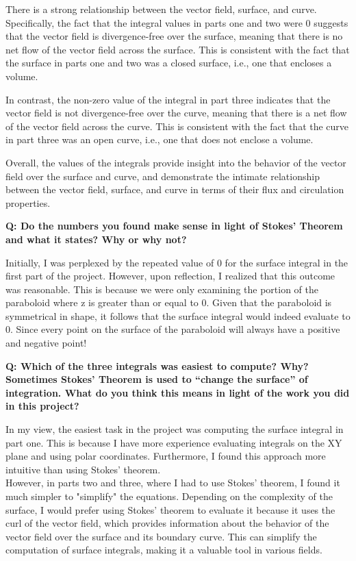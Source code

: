 \documentclass[a4paper]{article}
\begin{document}
There is a strong relationship between the vector field, surface, and curve. Specifically, the fact that the integral values in parts one and two were 0 suggests that the vector field is divergence-free over the surface, meaning that there is no net flow of the vector field across the surface. This is consistent with the fact that the surface in parts one and two was a closed surface, i.e., one that encloses a volume.

In contrast, the non-zero value of the integral in part three indicates that the vector field is not divergence-free over the curve, meaning that there is a net flow of the vector field across the curve. This is consistent with the fact that the curve in part three was an open curve, i.e., one that does not enclose a volume.

Overall, the values of the integrals provide insight into the behavior of the vector field over the surface and curve, and demonstrate the intimate relationship between the vector field, surface, and curve in terms of their flux and circulation properties.
 
\textbf{Q: Do the numbers you found make sense in light of Stokes’ Theorem and what it states?  Why or why not?}

Initially, I was perplexed by the repeated value of 0 for the surface integral in the first part of the project. However, upon reflection, I realized that this outcome was reasonable. This is because we were only examining the portion of the paraboloid where z is greater than or equal to 0. Given that the paraboloid is symmetrical in shape, it follows that the surface integral would indeed evaluate to 0. Since every point on the surface of the paraboloid will always have a positive and negative point!


\textbf{Q: Which of the three integrals was easiest to compute?  Why?  
Sometimes Stokes’ Theorem is used to “change the surface” of integration.  What do you think this means in light of the work you did in this project?}

In my view, the easiest task in the project was computing the surface integral in part one. This is because I have more experience evaluating integrals on the XY plane and using polar coordinates. Furthermore, I found this approach more intuitive than using Stokes' theorem.
\\
However, in parts two and three, where I had to use Stokes' theorem, I found it much simpler to "simplify" the equations. Depending on the complexity of the surface, I would prefer using Stokes' theorem to evaluate it because it uses the curl of the vector field, which provides information about the behavior of the vector field over the surface and its boundary curve. This can simplify the computation of surface integrals, making it a valuable tool in various fields.
\end{document}
